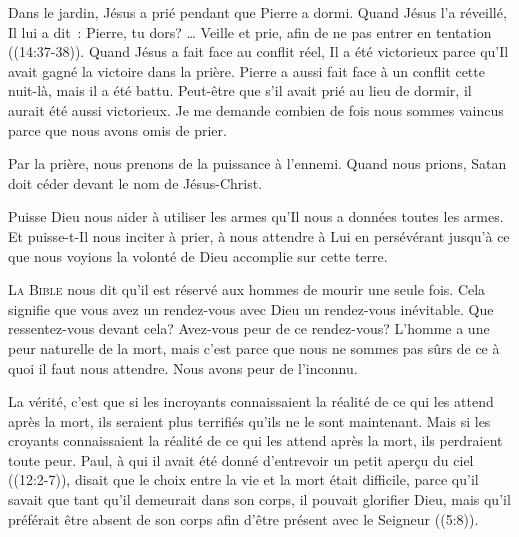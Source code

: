 
Dans le jardin, Jésus a prié pendant que Pierre a dormi.
 Quand Jésus l'a réveillé, Il lui a dit~: 
 \og Pierre, tu dors? \dots{} Veille et prie, afin de ne pas entrer
 en tentation \fg{} ((14:37-38)).
 Quand Jésus a fait face au conflit réel, Il a été victorieux
 parce qu'Il avait gagné la victoire dans la prière.
 Pierre a aussi fait face à un conflit cette nuit-là, mais il a été battu.
 Peut-être que s'il avait prié au lieu de dormir,
 il aurait été aussi victorieux. Je me demande combien de fois
 nous sommes vaincus parce que nous avons omis de prier.

Par la prière, nous prenons de la puissance à l'ennemi.
 Quand nous prions, Satan doit céder devant le nom de Jésus-Christ.

Puisse Dieu nous aider à utiliser les armes qu'Il nous a données
 \ocadr toutes les armes. Et puisse-t-Il nous inciter à prier,
 à nous attendre à Lui en persévérant jusqu'à ce que nous voyions
 la volonté de Dieu accomplie sur cette terre.

\dvrule






\lettrine{L}{a Bible} nous dit
 qu'il est réservé aux hommes de mourir une seule fois.
 Cela signifie que vous avez un rendez-vous avec Dieu
 \ocadr un rendez-vous inévitable. Que ressentez-vous devant cela?
 Avez-vous peur de ce rendez-vous? L'homme a une peur naturelle de la mort,
 mais c'est parce que nous ne sommes pas sûrs de ce à quoi
 il faut nous attendre. Nous avons peur de l'inconnu.


La vérité, c'est que si les incroyants connaissaient la réalité
 de ce qui les attend après la mort, ils seraient plus terrifiés
 qu'ils ne le sont maintenant. Mais si les croyants connaissaient
 la réalité de ce qui les attend après la mort, ils perdraient toute peur.
 Paul, à qui il avait été donné d'entrevoir un petit aperçu du ciel
 ((12:2-7)), disait que le choix entre la vie et la mort
 était difficile, parce qu'il savait que tant qu'il demeurait dans son corps,
 il pouvait glorifier Dieu, mais qu'il préférait être absent de son corps
 afin d'être présent avec le Seigneur ((5:8)).

